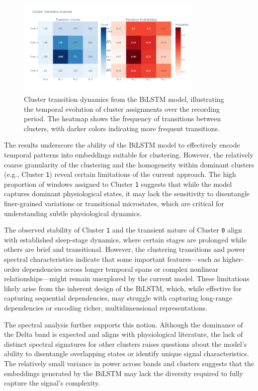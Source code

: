 \documentclass[a4paper,12pt,twoside]{article}
\begin{document}
\begin{figure}[H]
\centering
\includegraphics[width=0.8\textwidth]{img/bilstm cluster transition analysis.png}
\caption{Cluster transition dynamics from the BiLSTM model, illustrating the temporal evolution of cluster assignments over the recording period. The heatmap shows the frequency of transitions between clusters, with darker colors indicating more frequent transitions.}
\label{fig:bilstm_cluster_transition_analysis}
\end{figure}

The results underscore the ability of the BiLSTM model to effectively encode temporal patterns into embeddings suitable for clustering. However, the relatively coarse granularity of the clustering and the homogeneity within dominant clusters (e.g., Cluster \texttt{1}) reveal certain limitations of the current approach. The high proportion of windows assigned to Cluster \texttt{1} suggests that while the model captures dominant physiological states, it may lack the sensitivity to disentangle finer-grained variations or transitional microstates, which are critical for understanding subtle physiological dynamics.

The observed stability of Cluster \texttt{1} and the transient nature of Cluster \texttt{0} align with established sleep-stage dynamics, where certain stages are prolonged while others are brief and transitional. However, the clustering transitions and power spectral characteristics indicate that some important features—such as higher-order dependencies across longer temporal spans or complex nonlinear relationships—might remain unexplored by the current model. These limitations likely arise from the inherent design of the BiLSTM, which, while effective for capturing sequential dependencies, may struggle with capturing long-range dependencies or encoding richer, multidimensional representations.

The spectral analysis further supports this notion. Although the dominance of the Delta band is expected and aligns with physiological literature, the lack of distinct spectral signatures for other clusters raises questions about the model's ability to disentangle overlapping states or identify unique signal characteristics. The relatively small variance in power across bands and clusters suggests that the embeddings generated by the BiLSTM may lack the diversity required to fully capture the signal's complexity.
\end{document}

